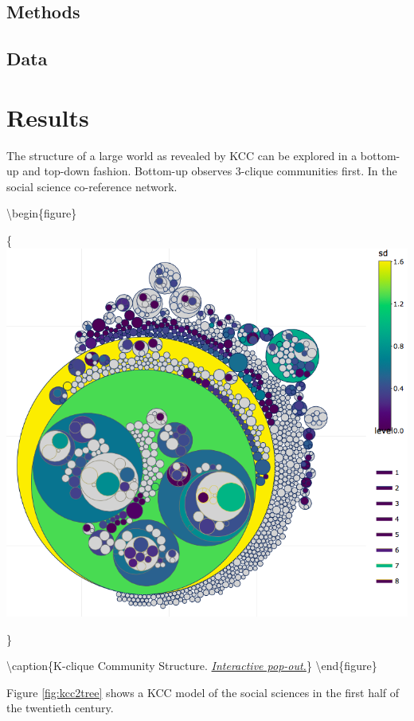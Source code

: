 \documentclass[]{book}
\theoremstyle{definition}
\theoremstyle{definition}
\theoremstyle{definition}
\theoremstyle{remark}
\begin{document}
\hypertarget{methods}{%
\subsection{Methods}\label{methods}}

\hypertarget{data-1}{%
\subsection{Data}\label{data-1}}

\hypertarget{results-2}{%
\section{Results}\label{results-2}}

The structure of a large world as revealed by KCC can be explored in a
bottom-up and top-down fashion. Bottom-up observes 3-clique communities
first. In the social science co-reference network.

\textbackslash begin\{figure\}

\{\centering \includegraphics[width=0.9\linewidth]{img/kcc2tree}

\}

\textbackslash caption\{K-clique Community Structure.
\href{exh/kcc2tree.html}{\emph{Interactive pop-out.}}\}\label{fig:kcc2tree}
\textbackslash end\{figure\}

Figure \ref{fig:kcc2tree} shows a KCC model of the social sciences in
the first half of the twentieth century.
\end{document}

